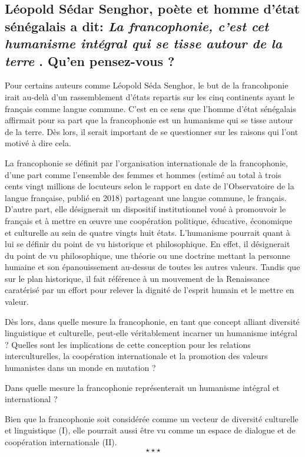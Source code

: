 \newpage \begin{center}
	\subsection*{Léopold Sédar Senghor, poète et homme d’état sénégalais a dit: \guillemetleft \textit{La francophonie, c’est cet humanisme intégral qui se tisse autour de la terre} \guillemetright. Qu’en pensez-vous ? }
\end{center}

Pour certains auteurs comme Léopold Séda Senghor, le but de la francohponie irait au-delà d'un rassemblement d'états repartis sur les cinq continents ayant le français comme langue commune. C'est en ce sens que l'homme d'état sénégalais affirmait pour sa part que la francophonie est un humanisme qui se tisse autour de la terre. Dès lors, il serait important de se questionner sur les raisons qui l'ont motivé à dire cela.

La francophonie se définit par l'organisation internationale de la francophonie, d'une part comme l'ensemble des femmes et hommes (estimé au total à trois cents vingt millions de locuteurs selon le rapport en date de l'Observatoire de la langue française, publié en 2018) partageant une langue commune, le français. D'autre part, elle désignerait un dispositif institutionnel voué à promouvoir le français et à mettre en œuvre une coopération politique, éducative, économique et culturelle au sein de quatre vingts huit états. L'humanisme pourrait quant à lui se définir du point de vu historique et philosophique. En effet, il désignerait du point de vu philosophique, une théorie ou une doctrine mettant la personne humaine et son épanouissement au-dessus de toutes les autres valeurs. Tandis que sur le plan historique, il fait référence à un mouvement de la Renaissance caratérisé par un effort pour relever la dignité de l'esprit humain et le mettre en valeur.

Dès lors, dans quelle mesure la francophonie, en tant que concept alliant diversité linguistique et culturelle, peut-elle véritablement incarner un humanisme intégral ?  Quelles sont les implications de cette conception pour les relations interculturelles, la coopération internationale et la promotion des valeurs humanistes dans un monde en mutation ?

Dans quelle mesure la francophonie représenterait un humanisme intégral et international ?

Bien que la francophonie soit considérée comme un vecteur de diversité culturelle et linguistique (I), elle pourrait aussi être vu comme un espace de dialogue et de coopération internationale (II).
$$\star \star \star$$


